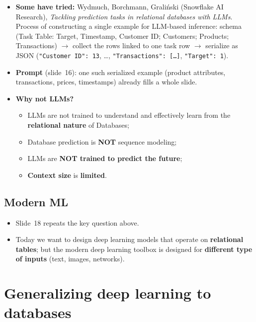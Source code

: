 \begin{itemize}
  \item \textbf{Some have tried:} Wydmuch, Borchmann, Grali\'nski (Snowflake AI Research),
    \emph{Tackling prediction tasks in relational databases with LLMs}. Process of
    constructing a single example for LLM-based inference: schema (Task Table: Target,
    Timestamp, Customer ID; Customers; Products; Transactions) $\to$ collect the rows
    linked to one task row $\to$ serialize as JSON (\texttt{"Customer ID": 13},
    \dots, \texttt{"Transactions": [\dots]}, \texttt{"Target": 1}).
  \item \textbf{Prompt} (slide~16): one such serialized example (product attributes,
    transactions, prices, timestamps) already fills a whole slide.
  \item \textbf{Why not LLMs?}
    \begin{itemize}
      \item LLMs are not trained to understand and effectively learn from the
        \textbf{relational nature} of Databases;
      \item Database prediction is \textbf{NOT} sequence modeling;
      \item LLMs are \textbf{NOT trained to predict the future};
      \item \textbf{Context size} is \textbf{limited}.
    \end{itemize}
\end{itemize}

\subsection{Modern ML}\label{sec:lec12-modern}

\begin{itemize}
  \item Slide~18 repeats the key question above.
  \item Today we want to design deep learning models that operate on \textbf{relational
    tables}; but the modern deep learning toolbox is designed for \textbf{different type
    of inputs} (text, images, networks).
\end{itemize}

\section{Generalizing deep learning to databases}\label{sec:lec12-generalize}

